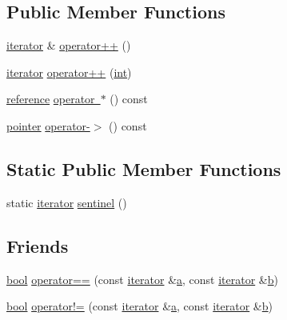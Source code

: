 \subsection*{Public Member Functions}
\begin{DoxyCompactItemize}
\item 
\mbox{\hyperlink{classiterator}{iterator}} \& \mbox{\hyperlink{classiterator_a4adf5ce6a7bb9704511805c89b79684d}{operator++}} ()
\item 
\mbox{\hyperlink{classiterator}{iterator}} \mbox{\hyperlink{classiterator_a49f48e4e587336b7fa48d609ee8f1779}{operator++}} (\mbox{\hyperlink{warnings_8h_a74f207b5aa4ba51c3a2ad59b219a423b}{int}})
\item 
\mbox{\hyperlink{classiterator_af05a87057b5891fb984648429ca60492}{reference}} \mbox{\hyperlink{classiterator_a1a895cbe29c76f26c410dbbfe3565425}{operator $\ast$}} () const
\item 
\mbox{\hyperlink{classiterator_a47f6aa746357c82353203dfcbe8d8c1c}{pointer}} \mbox{\hyperlink{classiterator_ae157ebb58c3c02e644023b31616f2491}{operator-\/$>$}} () const
\end{DoxyCompactItemize}
\subsection*{Static Public Member Functions}
\begin{DoxyCompactItemize}
\item 
static \mbox{\hyperlink{classiterator}{iterator}} \mbox{\hyperlink{classiterator_ace2b4797f9e34e51c1df9d52ba164203}{sentinel}} ()
\end{DoxyCompactItemize}
\subsection*{Friends}
\begin{DoxyCompactItemize}
\item 
\mbox{\hyperlink{asdl_8h_af6a258d8f3ee5206d682d799316314b1}{bool}} \mbox{\hyperlink{classiterator_a81d10d7799462c7ca5e7cf19119ca356}{operator==}} (const \mbox{\hyperlink{classiterator}{iterator}} \&\mbox{\hyperlink{_s_d_l__opengl__glext_8h_a3309789fc188587d666cda5ece79cf82}{a}}, const \mbox{\hyperlink{classiterator}{iterator}} \&\mbox{\hyperlink{_s_d_l__opengl__glext_8h_a0f71581a41fd2264c8944126dabbd010}{b}})
\item 
\mbox{\hyperlink{asdl_8h_af6a258d8f3ee5206d682d799316314b1}{bool}} \mbox{\hyperlink{classiterator_a55a8ee0e80dad1a7da9d751c25bc0386}{operator!=}} (const \mbox{\hyperlink{classiterator}{iterator}} \&\mbox{\hyperlink{_s_d_l__opengl__glext_8h_a3309789fc188587d666cda5ece79cf82}{a}}, const \mbox{\hyperlink{classiterator}{iterator}} \&\mbox{\hyperlink{_s_d_l__opengl__glext_8h_a0f71581a41fd2264c8944126dabbd010}{b}})
\end{DoxyCompactItemize}
